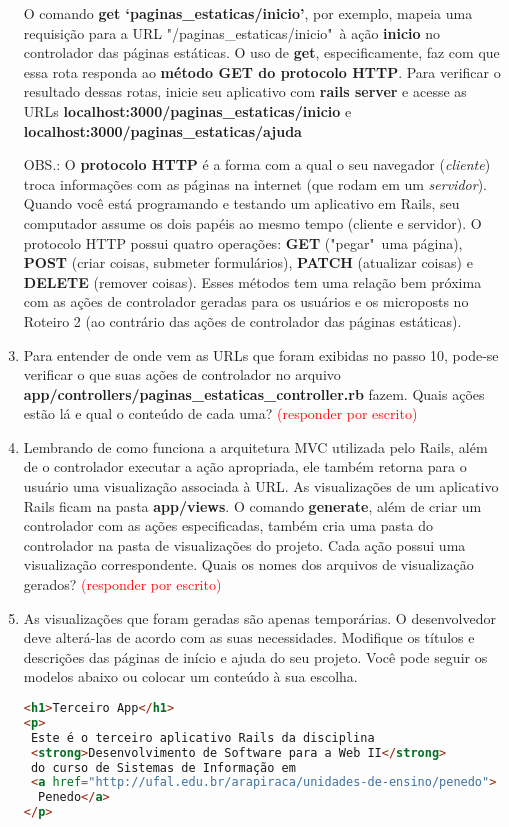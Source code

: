 \documentclass[a4paper,12pt]{article}
\begin{document}
\begin{enumerate}
  O comando \textbf{get `paginas\_estaticas/inicio'}, por exemplo, mapeia uma requisição para a URL "/paginas\_estaticas/inicio"\ à ação \textbf{inicio} no controlador das páginas estáticas. O uso de \textbf{get}, especificamente, faz com que essa rota responda ao \textbf{método GET do protocolo HTTP}. Para verificar o resultado dessas rotas, inicie seu aplicativo com \textbf{rails server} e acesse as URLs \textbf{localhost:3000/paginas\_estaticas/inicio} e \textbf{localhost:3000/paginas\_estaticas/ajuda}
  \item [OBS.:] O \textbf{protocolo HTTP} é a forma com a qual o seu navegador (\textit{cliente}) troca informações com as páginas na internet (que rodam em um \textit{servidor}). Quando você está programando e testando um aplicativo em Rails, seu computador assume os dois papéis ao mesmo tempo (cliente e servidor). O protocolo HTTP possui quatro operações: \textbf{GET} ("pegar"\ uma página), \textbf{POST} (criar coisas, submeter formulários), \textbf{PATCH} (atualizar coisas) e \textbf{DELETE} (remover coisas). Esses métodos tem uma relação bem próxima com as ações de controlador geradas para os usuários e os microposts no Roteiro 2 (ao contrário das ações de controlador das páginas estáticas).
  \item Para entender de onde vem as URLs que foram exibidas no passo 10, pode-se verificar o que suas ações de controlador no arquivo \textbf{app/controllers/paginas\_estaticas\_controller.rb} fazem. Quais ações estão lá e qual o conteúdo de cada uma? \textcolor{red}{(responder por escrito)}
  \item Lembrando de como funciona a arquitetura MVC utilizada pelo Rails, além de o controlador executar a ação apropriada, ele também retorna para o usuário uma visualização associada à URL. As visualizações de um aplicativo Rails ficam na pasta \textbf{app/views}. O comando \textbf{generate}, além de criar um controlador com as ações especificadas, também cria uma pasta do controlador na pasta de visualizações do projeto. Cada ação possui uma visualização correspondente. Quais os nomes dos arquivos de visualização gerados? \textcolor{red}{(responder por escrito)}
  \item As visualizações que foram geradas são apenas temporárias. O desenvolvedor deve alterá-las de acordo com as suas necessidades. Modifique os títulos e descrições das páginas de início e ajuda do seu projeto. Você pode seguir os modelos abaixo ou colocar um conteúdo à sua escolha.

  \begin{lstlisting}[language=html, title=app/views/paginas\_estaticas/inicio.html.erb, basicstyle=\scriptsize]
<h1>Terceiro App</h1>
<p>
 Este é o terceiro aplicativo Rails da disciplina
 <strong>Desenvolvimento de Software para a Web II</strong>
 do curso de Sistemas de Informação em
 <a href="http://ufal.edu.br/arapiraca/unidades-de-ensino/penedo">
  Penedo</a>
</p>
  \end{lstlisting}


\end{enumerate}
\end{document}
